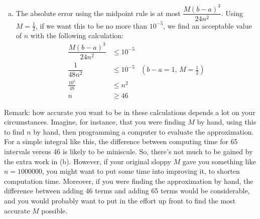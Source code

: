 \begin{solution}
\begin{enumerate}[(a)]
\item The absolute  error using the midpoint rule is at most $\dfrac{M(b-a)^3}{24n^2}$. Using $M=\frac{1}{2}$, if we want this to be no more than $10^{-5}$, we find an acceptable value of $n$ with the following calculation:
\begin{align*}
\dfrac{M(b-a)^3}{24n^2}&\leq 10^{-5}\\
\dfrac{1}{48n^2}&\leq 10^{-5}&(b-a=1,\,M=\frac{1}{2})\\
\frac{10^5}{48} & \leq n^2\\
n & \geq 46
\end{align*}
\end{enumerate}
Remark: how accurate you want to be in these calculations depends a lot on your circumstances. Imagine, for instance, that you were finding $M$ by hand, using this to find $n$ by hand, then programming a computer to evaluate the approximation. For a simple integral like this, the difference between computing time for 65 intervals versus 46 is likely to be miniscule. So, there's not much to be gained by the extra work in (b). However, if your original sloppy $M$ gave you something like $n=1000000$, you might want to put some time into improving it, to shorten computation time. Moreover, if you were finding the approximation by hand, the difference between adding 46 terms and adding 65 terms would be considerable, and you would probably want to put in the effort up front to find the most accurate $M$ possible.
\end{solution}


